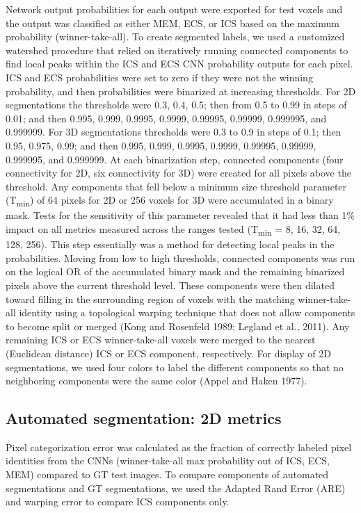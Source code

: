 \documentclass{article}
\begin{document}
Network output probabilities for each output were exported for test voxels and the output was classified as either MEM, ECS, or ICS based on the maximum probability (winner-take-all). To create segmented labels, we used a customized watershed procedure that relied on iteratively running connected components to find local peaks within the ICS and ECS CNN probability outputs for each pixel. ICS and ECS probabilities were set to zero if they were not the winning probability, and then probabilities were binarized at increasing thresholds. For 2D segmentations the thresholds were 0.3, 0.4, 0.5; then from 0.5 to 0.99 in steps of 0.01; and then 0.995, 0.999, 0.9995, 0.9999, 0.99995, 0.99999, 0.999995, and 0.999999. For 3D segmentations thresholds were 0.3 to 0.9 in steps of 0.1; then 0.95, 0.975, 0.99; and then 0.995, 0.999, 0.9995, 0.9999, 0.99995, 0.99999, 0.999995, and 0.999999. At each binarization step, connected components (four connectivity for 2D, six connectivity for 3D) were created for all pixels above the threshold. Any components that fell below a minimum size threshold parameter (T\textsubscript{min}) of 64 pixels for 2D or 256 voxels for 3D were accumulated in a binary mask. Tests for the sensitivity of this parameter revealed that it had less than 1\% impact on all metrics measured across the ranges tested (T\textsubscript{min} = 8, 16, 32, 64, 128, 256). This step essentially was a method for detecting local peaks in the probabilities. Moving from low to high thresholds, connected components was run on the logical OR of the accumulated binary mask and the remaining binarized pixels above the current threshold level. These components were then dilated toward filling in the surrounding region of voxels with the matching winner-take-all identity using a topological warping technique that does not allow components to become split or merged (Kong and Rosenfeld 1989; Legland et al., 2011). Any remaining ICS or ECS winner-take-all voxels were merged to the nearest (Euclidean distance) ICS or ECS component, respectively. For display of 2D segmentations, we used four colors to label the different components so that no neighboring components were the same color (Appel and Haken 1977).

\subsection*{Automated segmentation: 2D metrics}

Pixel categorization error was calculated as the fraction of correctly labeled pixel identities from the CNNs (winner-take-all max probability out of ICS, ECS, MEM) compared to GT test images. To compare components of automated segmentations and GT segmentations, we used the Adapted Rand Error (ARE) and warping error to compare ICS components only.
\end{document}
